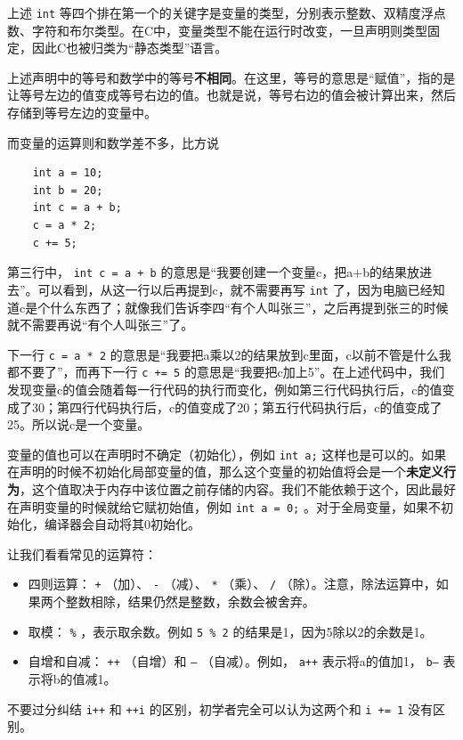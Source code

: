 上述 \texttt{int} 等四个排在第一个的关键字是变量的类型，分别表示整数、双精度浮点数、字符和布尔类型。在C中，变量类型不能在运行时改变，一旦声明则类型固定，因此C也被归类为“静态类型”语言。

上述声明中的等号和数学中的等号\textbf{不相同}。在这里，等号的意思是“赋值”，指的是让等号左边的值变成等号右边的值。也就是说，等号右边的值会被计算出来，然后存储到等号左边的变量中。

而变量的运算则和数学差不多，比方说
\begin{verbatim}
    int a = 10;
    int b = 20;
    int c = a + b;
    c = a * 2;
    c += 5;
\end{verbatim}

第三行中， \texttt{int c = a + b} 的意思是“我要创建一个变量c，把a+b的结果放进去”。可以看到，从这一行以后再提到c，就不需要再写 \texttt{int} 了，因为电脑已经知道c是个什么东西了；就像我们告诉李四“有个人叫张三”，之后再提到张三的时候就不需要再说“有个人叫张三”了。

下一行 \texttt{c = a * 2} 的意思是“我要把a乘以2的结果放到c里面，c以前不管是什么我都不要了”，而再下一行 \texttt{c += 5} 的意思是“我要把c加上5”。在上述代码中，我们发现变量c的值会随着每一行代码的执行而变化，例如第三行代码执行后，c的值变成了30；第四行代码执行后，c的值变成了20；第五行代码执行后，c的值变成了25。所以说c是一个变量。

变量的值也可以在声明时不确定（初始化），例如 \texttt{int a;} 这样也是可以的。如果在声明的时候不初始化局部变量的值，那么这个变量的初始值将会是一个\textbf{未定义行为}，这个值取决于内存中该位置之前存储的内容。我们不能依赖于这个，因此最好在声明变量的时候就给它赋初始值，例如 \texttt{int a = 0;} 。对于全局变量，如果不初始化，编译器会自动将其0初始化。

让我们看看常见的运算符：
\begin{itemize}
  \item 四则运算： \texttt{+} （加）、 \texttt{-} （减）、 \texttt{*} （乘）、 \texttt{/} （除）。注意，除法运算中，如果两个整数相除，结果仍然是整数，余数会被舍弃。
  \item 取模： \texttt{\%} ，表示取余数。例如 \texttt{5 \% 2} 的结果是1，因为5除以2的余数是1。
  \item 自增和自减： \texttt{++} （自增）和 \texttt{--} （自减）。例如， \texttt{a++} 表示将a的值加1， \texttt{b--} 表示将b的值减1。
\end{itemize}
不要过分纠结 \texttt{i++} 和 \texttt{++i} 的区别，初学者完全可以认为这两个和 \texttt{i += 1} 没有区别。

